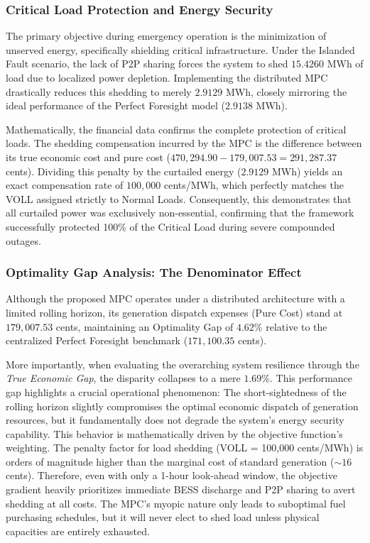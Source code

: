 \subsubsection{Critical Load Protection and Energy Security}
The primary objective during emergency operation is the minimization of unserved energy, specifically shielding critical infrastructure. Under the Islanded Fault scenario, the lack of P2P sharing forces the system to shed $15.4260$ MWh of load due to localized power depletion. Implementing the distributed MPC drastically reduces this shedding to merely $2.9129$ MWh, closely mirroring the ideal performance of the Perfect Foresight model ($2.9138$ MWh). 

Mathematically, the financial data confirms the complete protection of critical loads. The shedding compensation incurred by the MPC is the difference between its true economic cost and pure cost ($470,294.90 - 179,007.53 = 291,287.37$ cents). Dividing this penalty by the curtailed energy ($2.9129$ MWh) yields an exact compensation rate of $100,000$ cents/MWh, which perfectly matches the VOLL assigned strictly to Normal Loads. Consequently, this demonstrates that all curtailed power was exclusively non-essential, confirming that the framework successfully protected 100\% of the Critical Load during severe compounded outages.

\subsubsection{Optimality Gap Analysis: The Denominator Effect}
Although the proposed MPC operates under a distributed architecture with a limited rolling horizon, its generation dispatch expenses (Pure Cost) stand at $179,007.53$ cents, maintaining an Optimality Gap of $4.62\%$ relative to the centralized Perfect Foresight benchmark ($171,100.35$ cents). 

More importantly, when evaluating the overarching system resilience through the \textit{True Economic Gap}, the disparity collapses to a mere $1.69\%$. This performance gap highlights a crucial operational phenomenon: The short-sightedness of the rolling horizon slightly compromises the optimal economic dispatch of generation resources, but it fundamentally does not degrade the system's energy security capability. This behavior is mathematically driven by the objective function's weighting. The penalty factor for load shedding (VOLL = 100,000 cents/MWh) is orders of magnitude higher than the marginal cost of standard generation ($\sim 16$ cents). Therefore, even with only a 1-hour look-ahead window, the objective gradient heavily prioritizes immediate BESS discharge and P2P sharing to avert shedding at all costs. The MPC's myopic nature only leads to suboptimal fuel purchasing schedules, but it will never elect to shed load unless physical capacities are entirely exhausted.

